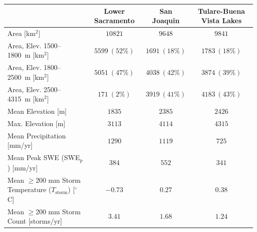 \begin{tabular}{lccc}
 & Lower Sacramento & San Joaquin & Tulare-Buena Vista Lakes  \\
\hline
Area [km$^2$] 
& $10821$ & $9648$ & $9841$
\\
Area, Elev. 1500--1800~m [km$^2$] 
& $5599 \ (52\%)$ & $1691 \ (18\%)$ & $1783 \ (18\%)$
\\
Area, Elev. 1800--2500~m [km$^2$] 
& $5051 \ (47\%)$ & $4038 \ (42\%)$ & $3874 \ (39\%)$
\\
Area, Elev. 2500--4315~m [km$^2$] 
& $171 \ (2\%)$ & $3919 \ (41\%)$ & $4183 \ (43\%)$
\\
Mean Elevation [m] 
& $1835$ & $2385$ & $2426$
\\
Max. Elevation [m] 
& $3113$ & $4114$ & $4315$
\\
Mean Precipitation [mm/yr] 
& $1290$ & $1119$ & $725$
\\
Mean Peak SWE (SWE$_\text{p}$) [mm/yr] 
& $384$ & $552$ & $341$
\\
Mean $\geq$200 mm Storm Temperature ($T_\text{storm}$) [$^\circ$C] 
& $-0.73$ & $0.27$ & $0.38$
\\
Mean $\geq$200 mm Storm Count [storms/yr] 
& $3.41$ & $1.68$ & $1.24$
\\
\hline
\end{tabular}
